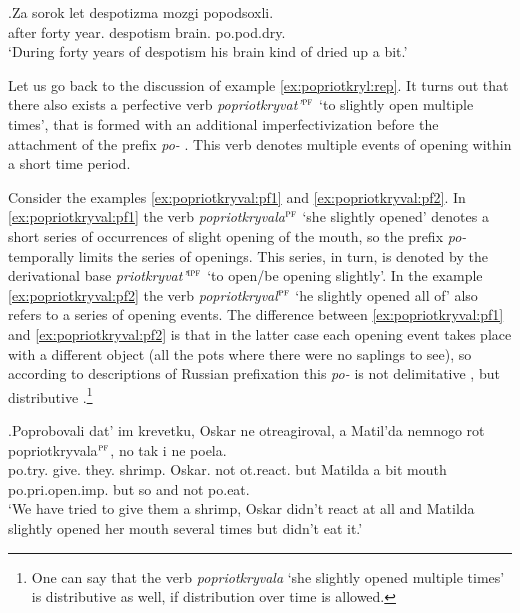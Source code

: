 \exg.\label{ex:popod-:rep}Za sorok let despotizma mozgi popodsoxli.\\
after forty year. despotism brain. po.pod.dry.\\
\trans `During forty years of despotism his brain kind of dried up a bit.'\\

Let us go back to the discussion of example \ref{ex:popriotkryl:rep}. It turns out that there also exists a perfective verb  \textit{popriotkryvat'}$^{\textsc{pf}}$ `to slightly open multiple times', that is formed with an additional imperfectivization  before the attachment of the prefix \textit{po-}  . This verb denotes multiple events of opening within a short time period. 

Consider the examples \ref{ex:popriotkryval:pf1} and \ref{ex:popriotkryval:pf2}. In \ref{ex:popriotkryval:pf1} the verb \textit{popriotkryvala}$^{\textsc{pf}}$ `she slightly opened' denotes a short series of  occurrences of slight opening of the mouth, so the prefix \textit{po-}   temporally limits the series of  openings. This series, in turn, is denoted by the derivational base \textit{priotkryvat'}$^{\textsc{ipf}}$ `to open/be opening slightly'. In the example \ref{ex:popriotkryval:pf2} the verb  \textit{popriotkryval}$^{\textsc{pf}}$ `he slightly opened all of' also refers to a series of  opening events. The difference between \ref{ex:popriotkryval:pf1} and \ref{ex:popriotkryval:pf2} is that in the latter case each opening event takes place with a different object (all the pots where there were no saplings to see), so according to descriptions of Russian prefixation  this \textit{po-}   is not delimitative , but distributive .\footnote{One can say that the verb \textit{popriotkryvala} `she slightly opened multiple times' is distributive  as well, if distribution over time is allowed.}

\exg.\label{ex:popriotkryval:pf1}Poprobovali dat' im krevetku, Oskar ne otreagiroval, a Matil'da nemnogo rot popriotkryvala$^{\textsc{pf}}$, no tak i ne poela.\\
po.try. give. they. shrimp. Oskar. not ot.react. but Matilda {a bit} mouth po.pri.open.imp. but so and not po.eat.\\
\trans `We have tried to give them a shrimp, Oskar didn't react at all and Matilda slightly opened her mouth several times but didn't eat it.'\\

